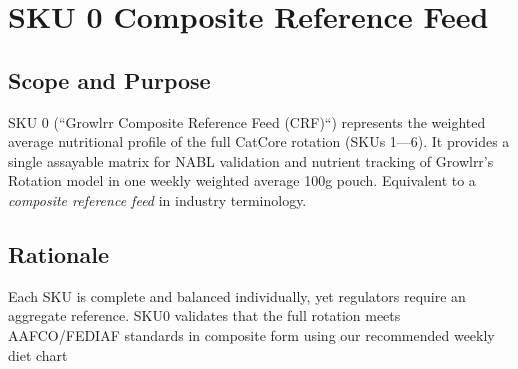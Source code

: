 \clearpage

\section*{SKU 0 Composite Reference Feed}

\subsection*{Scope and Purpose}
SKU 0 (``Growlrr Composite Reference Feed (CRF)``) represents the weighted average nutritional profile of the full CatCore rotation (SKUs 1---6). It provides a single assayable matrix for NABL validation and nutrient tracking of Growlrr's Rotation model in one  weekly weighted average 100g pouch. Equivalent to a \emph{composite reference feed} in industry terminology.

\subsection*{Rationale}
Each SKU is complete and balanced individually, yet regulators require an aggregate reference. SKU0 validates that the full rotation meets AAFCO/FEDIAF standards in composite form using our recommended weekly diet chart  

